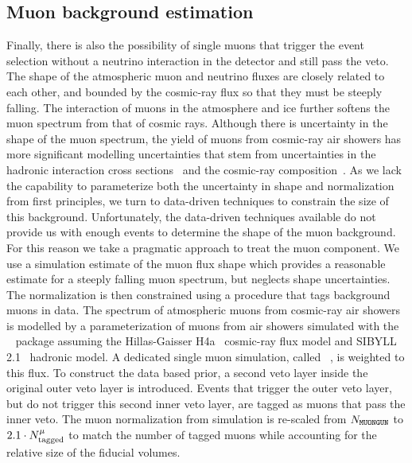 \subsection{Muon background estimation}
Finally, there is also the possibility of single muons that trigger the event selection without a neutrino interaction in the detector and still pass the veto.
The shape of the atmospheric muon and neutrino fluxes are closely related to each other, and bounded by the cosmic-ray flux so that they must be steeply falling.
The interaction of muons in the atmosphere and ice further softens the muon spectrum from that of cosmic rays.
Although there is uncertainty in the shape of the muon spectrum, the yield of muons from cosmic-ray air showers has more significant modelling uncertainties that stem from uncertainties in the hadronic interaction cross sections~\cite{Pierog:2017nes} and the cosmic-ray composition~\cite{Bluemer:2009zf}.
As we lack the capability to parameterize both the uncertainty in shape and normalization from first principles, we turn to data-driven techniques to constrain the size of this background.
Unfortunately, the data-driven techniques available do not provide us with enough events to determine the shape of the muon background.
For this reason we take a pragmatic approach to treat the muon component.
We use a simulation estimate of the muon flux shape which provides a reasonable estimate for a steeply falling muon spectrum, but neglects shape uncertainties.
The normalization is then constrained using a procedure that tags background muons in data.
The spectrum of atmospheric muons from cosmic-ray air showers is modelled by a parameterization of muons from air showers simulated with the \CORSIKA~\cite{Heck:1998vt} package assuming the Hillas-Gaisser H4a~\cite{Gaisser:2013bla} cosmic-ray flux model and SIBYLL 2.1~\cite{Ahn:2009wx} hadronic model.
A dedicated single muon simulation, called \MUONGUN~\cite{jvsthesis}, is weighted to this flux. 
To construct the data based prior, a second veto layer inside the original outer veto layer is introduced.
Events that trigger the outer veto layer, but do not trigger this second inner veto layer, are tagged as muons that pass the inner veto.
The muon normalization from simulation is re-scaled from $N_{\texttt{MUONGUN}}$ to $2.1\cdot N^\mu_\textmd{tagged}$ to match the number of tagged muons while accounting for the relative size of the fiducial volumes.
